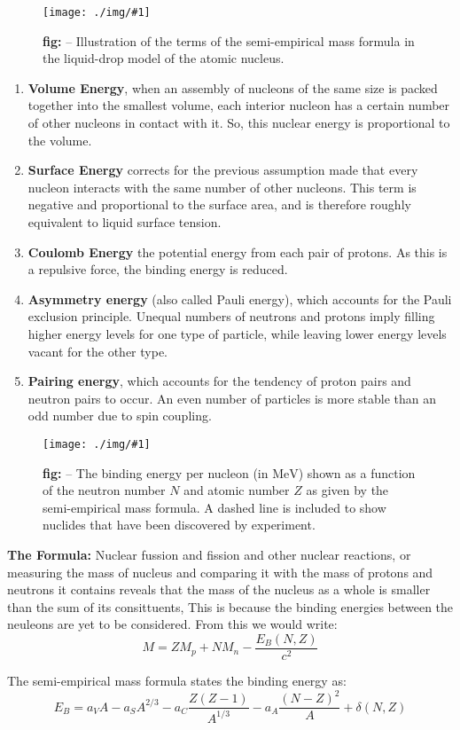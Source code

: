 \documentclass[10pt,a4paper]{article}
\newcounter{figurecounter}
\newcommand{\img}[3]{
    \begin{figure}[h!]
        \centering
        \captionsetup{justification=centering,margin=2cm,labelformat=empty}
        \texttt{[image: ./img/\#1]}
        \label{figure}
        \caption{\textbf{fig: \thefigurecounter} -- \textcolor{darkliver}{#3}}
    \end{figure}
    \addtocounter{figurecounter}{1}}
\newcommand{\mev}{\text{MeV}}
\begin{document}
\img{liquiddropmodel}{0.7}{Illustration of the terms of the semi-empirical mass formula in the liquid-drop model of the atomic nucleus.}

\begin{enumerate}
    \item \textbf{Volume Energy}, when an assembly of nucleons of the same size is packed together into the smallest volume, each interior nucleon has a certain number of other nucleons in contact with it. So, this nuclear energy is proportional to the volume.
    \item \textbf{Surface Energy} corrects for the previous assumption made that every nucleon interacts with the same number of other nucleons. This term is negative and proportional to the surface area, and is therefore roughly equivalent to liquid surface tension.
    \item \textbf{Coulomb Energy} the potential energy from each pair of protons. As this is a repulsive force, the binding energy is reduced.
    \item \textbf{Asymmetry energy} (also called Pauli energy), which accounts for the Pauli exclusion principle. Unequal numbers of neutrons and protons imply filling higher energy levels for one type of particle, while leaving lower energy levels vacant for the other type.
    \item \textbf{Pairing energy}, which accounts for the tendency of proton pairs and neutron pairs to occur. An even number of particles is more stable than an odd number due to spin coupling.
\end{enumerate}

\img{bindingenergies}{0.5}{The binding energy per nucleon (in $\mev$) shown as a function of the neutron number $N$ and atomic number $Z$ as given by the semi-empirical mass formula. A dashed line is included to show nuclides that have been discovered by experiment.}

\textbf{The Formula:} Nuclear fussion and fission and other nuclear reactions, or measuring the mass of nucleus and comparing it with the mass of protons and neutrons it contains reveals that the mass of the nucleus as a whole is smaller than the sum of its consittuents, This is because the binding energies between the neuleons are yet to be considered. From this we would write:
\begin{equation}
    M = ZM_p + NM_n - \frac{E_B(N,Z)}{c^2}
\end{equation}

The semi-empirical mass formula states the binding energy as:
\begin{equation}
    E_B = a_V A - a_S A^{2/3} - a_C\frac{Z(Z-1)}{A^{1/3}}-a_A\frac{(N-Z)^2}{A} +\delta(N,Z)
\end{equation}
\end{document}
